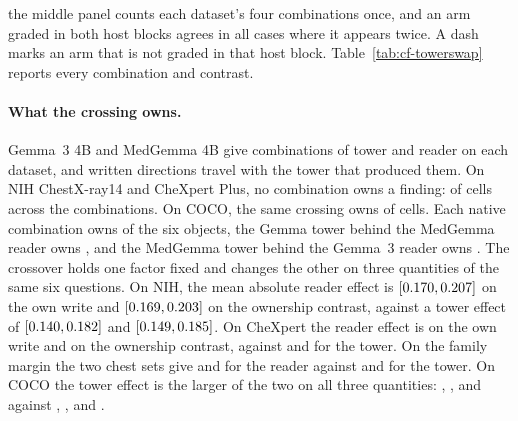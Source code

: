 the middle panel counts each dataset's four combinations once, and an arm graded in both host blocks agrees in all \cfSwapArmsTwice{} cases where it appears twice. A dash marks an arm that is not graded in that host block. Table~\ref{tab:cf-towerswap} reports every combination and contrast.

\paragraph{What the crossing owns.} Gemma~3 4B and MedGemma 4B give \cfSwapCombos{} combinations of tower and reader on each dataset, and written directions travel with the tower that produced them. On NIH ChestX-ray14 and CheXpert Plus, no combination owns a finding: \cfSwapChestOwned{} of \cfSwapChestCells{} cells across the \cfSwapChestCombos{} combinations. On COCO, the same crossing owns \cfSwapCocoOwned{} of \cfSwapCocoCells{} cells. Each native combination owns \cfSwapCocoNativeMin{} of the six objects, the Gemma tower behind the MedGemma reader owns \cfSwapCocoGemmaTowerCross{}, and the MedGemma tower behind the Gemma~3 reader owns \cfSwapCocoMedTowerCross{}. The crossover holds one factor fixed and changes the other on three quantities of the same six questions. On NIH, the mean absolute reader effect is \cfSwapReaderNihMin{} $[0.170,0.207]$ on the own write and \cfSwapReaderNihOMin{} $[0.169,0.203]$ on the ownership contrast, against a tower effect of \cfSwapTowerNihMin{} $[0.140,0.182]$ and \cfSwapTowerNihOMin{} $[0.149,0.185]$. On CheXpert the reader effect is \cfSwapReaderChexMin{} on the own write and \cfSwapReaderChexOMin{} on the ownership contrast, against \cfSwapTowerChexMin{} and \cfSwapTowerChexOMin{} for the tower. On the family margin the two chest sets give \cfSwapReaderNihMMin{} and \cfSwapReaderChexMMin{} for the reader against \cfSwapTowerNihMMin{} and \cfSwapTowerChexMMin{} for the tower. On COCO the tower effect is the larger of the two on all three quantities: \cfSwapTowerCocoMin{}, \cfSwapTowerCocoOMin{}, and \cfSwapTowerCocoMMin{} against \cfSwapReaderCocoMin{}, \cfSwapReaderCocoOMin{}, and \cfSwapReaderCocoMMin{}.

